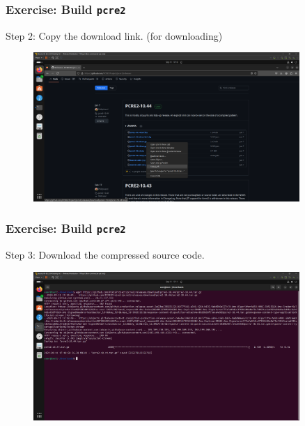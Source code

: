 \begin{frame}
    \frametitle{Exercise: Build \texttt{pcre2}}

    Step 2: Copy the download link. (for downloading)

    \begin{figure}[H]
        \centering
        \includegraphics[width=0.9\textwidth]{../figure/pcre2_build_2.png}
    \end{figure}

\end{frame}

\begin{frame}
    \frametitle{Exercise: Build \texttt{pcre2}}

    Step 3: Download the compressed source code.

    \begin{figure}[H]
        \centering
        \includegraphics[width=0.9\textwidth]{../figure/pcre2_build_3.png}
    \end{figure}

\end{frame}

